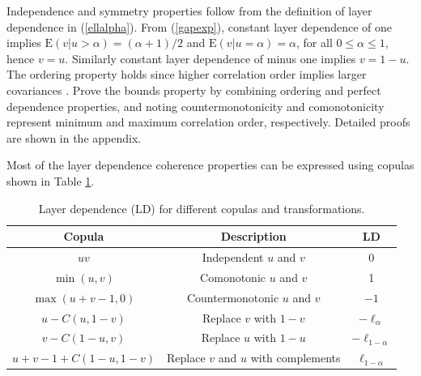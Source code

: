 \documentclass[authoryear]{elsarticle}
\newcommand{\E}{{\mathrm E}}
\newcommand{\eref}[1]{(\ref{#1})}
\newcommand{\aref}[1]{\ref{#1}}
\begin{document}
Independence and symmetry properties follow from the definition of layer dependence in \eref{ellalpha}. From \eref{gapexp}, constant layer dependence of one implies $\E(v|u>\alpha)=(\alpha+1)/2$ and $\E(v|u=\alpha)=\alpha$, for all $0\leq\alpha\leq 1$, hence $v=u$. Similarly constant layer dependence of minus one implies $v=1-u$. The ordering property holds since higher correlation order implies larger covariances \citep{dhaene2009correlation}. Prove the bounds property by combining ordering and perfect dependence properties, and noting countermonotonicity and comonotonicity represent minimum and maximum correlation order, respectively. Detailed proofs are shown in the appendix.


Most of the layer dependence coherence properties can be expressed using copulas shown in Table \aref{table1}.

\begin{table}[h]
  \begin{center}
\begin{tabular}{c|c|c }
 Copula & Description & LD \\
 \hline
 $uv$ & Independent $u$ and $v$ & 0 \\
 $\min(u,v)$ & Comonotonic $u$ and $v$ & 1 \\
 $\max(u+v-1,0)$ & Countermonotonic $u$ and $v$ & $-1$\\
 $u-C(u,1-v)$ & Replace $v$ with $1-v$ & $-\ell_\alpha$ \\
 $v-C(1-u,v)$ & Replace $u$ with $1-u$ & $-\ell_{1-\alpha}$ \\
 $u+v-1+C(1-u,1-v)$ & Replace $v$ and $u$ with complements & $\ell_{1-\alpha}$\\
 \hline
\end{tabular}
\caption{Layer dependence (LD) for different copulas and transformations.}\label{table1}
  \end{center}
\end{table}
\end{document}
